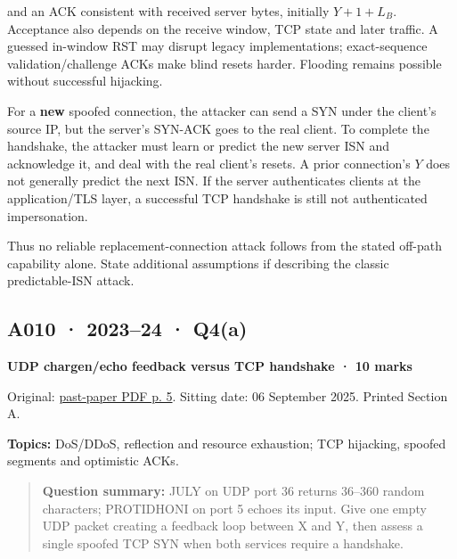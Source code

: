 \documentclass[11pt,a4paper]{article}
\begin{document}
and an ACK consistent with received server bytes,\allowbreak{} initially \(Y+1+L_B\). Acceptance also depends on the receive window,\allowbreak{} TCP state and later traffic. A guessed in-window RST may disrupt legacy implementations; exact-sequence validation/\allowbreak{}challenge ACKs make blind resets harder. Flooding remains possible without successful hijacking.


For a \textbf{new} spoofed connection,\allowbreak{} the attacker can send a SYN under the client's source IP,\allowbreak{} but the server's SYN-ACK goes to the real client. To complete the handshake,\allowbreak{} the attacker must learn or predict the new server ISN and acknowledge it,\allowbreak{} and deal with the real client's resets. A prior connection's \(Y\) does not generally predict the next ISN. If the server authenticates clients at the application/\allowbreak{}TLS layer,\allowbreak{} a successful TCP handshake is still not authenticated impersonation.


Thus no reliable replacement-connection attack follows from the stated off-path capability alone. State additional assumptions if describing the classic predictable-ISN attack.




\clearpage
\subsection{A010 · 2023–24 · Q4(a)}\label{a010}

\textbf{UDP chargen/\allowbreak{}echo feedback versus TCP handshake · 10 marks}


Original: \href{../../CSE405-Security_Merged.pdf\#page=5}{past-paper PDF p. 5}. Sitting date: 06 September 2025. Printed Section A.


\textbf{Topics:} DoS/\allowbreak{}DDoS,\allowbreak{} reflection and resource exhaustion; TCP hijacking,\allowbreak{} spoofed segments and optimistic ACKs.



\begin{quote}\small

\textbf{Question summary:} JULY on UDP port 36 returns 36–360 random characters; PROTIDHONI on port 5 echoes its input. Give one empty UDP packet creating a feedback loop between X and Y,\allowbreak{} then assess a single spoofed TCP SYN when both services require a handshake.



\end{quote}
\end{document}
